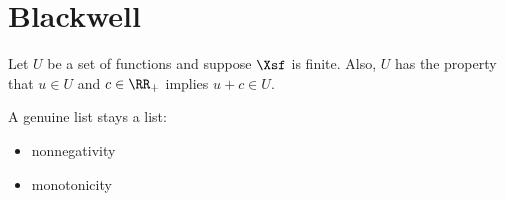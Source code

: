 \section{Blackwell}

Let $U$ be a set of functions and suppose $\Xsf$ is
finite.  Also, $U$ has the property that $u \in U$ and $c \in \RR_+$ implies $u
+ c \in U$.

A genuine list stays a list:
\begin{itemize}
    \item nonnegativity
    \item monotonicity
\end{itemize}
